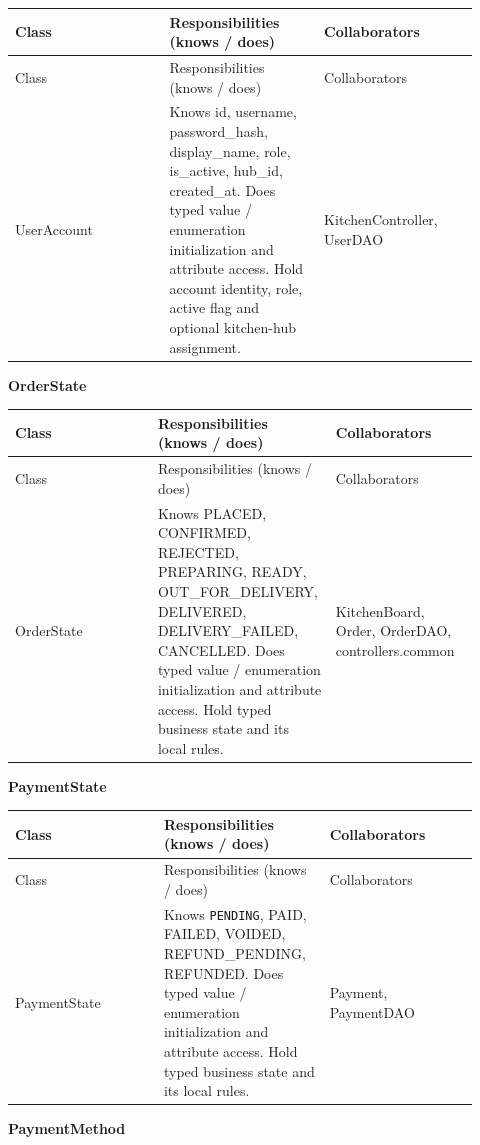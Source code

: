 \begin{longtable}{>{\raggedright\arraybackslash}p{0.3067\linewidth}>{\raggedright\arraybackslash}p{0.3067\linewidth}>{\raggedright\arraybackslash}p{0.3067\linewidth}}
Class & Responsibilities (knows / does) & Collaborators \\
\hline\endfirsthead
Class & Responsibilities (knows / does) & Collaborators \\
\hline\endhead
UserAccount & Knows id, username, password\_hash, display\_name, role, is\_active, hub\_id, created\_at. Does typed value / enumeration initialization and attribute access. Hold account identity, role, active flag and optional kitchen-hub assignment. & KitchenController, UserDAO \\
\end{longtable}
\textbf{OrderState}

\begin{longtable}{>{\raggedright\arraybackslash}p{0.3067\linewidth}>{\raggedright\arraybackslash}p{0.3067\linewidth}>{\raggedright\arraybackslash}p{0.3067\linewidth}}
Class & Responsibilities (knows / does) & Collaborators \\
\hline\endfirsthead
Class & Responsibilities (knows / does) & Collaborators \\
\hline\endhead
OrderState & Knows PLACED, CONFIRMED, REJECTED, PREPARING, READY, OUT\_FOR\_DELIVERY, DELIVERED, DELIVERY\_FAILED, CANCELLED. Does typed value / enumeration initialization and attribute access. Hold typed business state and its local rules. & KitchenBoard, Order, OrderDAO, controllers.common \\
\end{longtable}
\textbf{PaymentState}

\begin{longtable}{>{\raggedright\arraybackslash}p{0.3067\linewidth}>{\raggedright\arraybackslash}p{0.3067\linewidth}>{\raggedright\arraybackslash}p{0.3067\linewidth}}
Class & Responsibilities (knows / does) & Collaborators \\
\hline\endfirsthead
Class & Responsibilities (knows / does) & Collaborators \\
\hline\endhead
PaymentState & Knows \texttt{PENDING}, PAID, FAILED, VOIDED, REFUND\_PENDING, REFUNDED. Does typed value / enumeration initialization and attribute access. Hold typed business state and its local rules. & Payment, PaymentDAO \\
\end{longtable}
\textbf{PaymentMethod}

